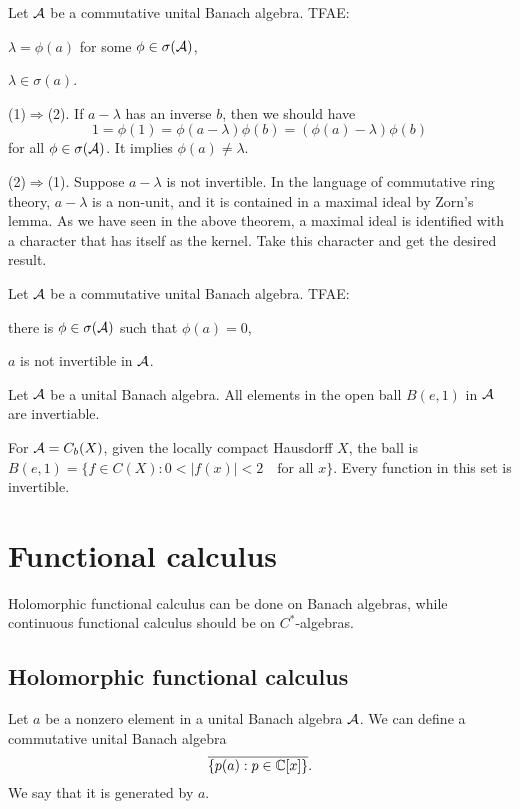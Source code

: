 \documentclass{../crs}
\begin{document}
\begin{thm}
Let $\mathcal{A}$ be a commutative unital Banach algebra.
TFAE:
\begin{cond}
\item $\lambda=\phi(a)$ for some $\phi\in\sigma(\mathcal{A})$,
\item $\lambda\in\sigma(a)$.
\end{cond}
\end{thm}
\begin{pf}
(1)$\Rightarrow$(2).
If $a-\lambda$ has an inverse $b$, then we should have
\[1=\phi(1)=\phi(a-\lambda)\phi(b)=(\phi(a)-\lambda)\phi(b)\]
for all $\phi\in\sigma(\mathcal{A})$.
It implies $\phi(a)\ne\lambda$.

(2)$\Rightarrow$(1).
Suppose $a-\lambda$ is not invertible.
In the language of commutative ring theory, $a-\lambda$ is a non-unit, and it is contained in a maximal ideal by Zorn's lemma.
As we have seen in the above theorem, a maximal ideal is identified with a character that has itself as the kernel.
Take this character and get the desired result.
\end{pf}

\begin{cor}
Let $\mathcal{A}$ be a commutative unital Banach algebra.
TFAE:
\begin{cond}
\item there is $\phi\in\sigma(\mathcal{A})$ such that $\phi(a)=0$,
\item $a$ is not invertible in $\mathcal{A}$.
\end{cond}
\end{cor}
\begin{cor}
Let $\mathcal{A}$ be a unital Banach algebra.
All elements in the open ball $B(e,1)$ in $\mathcal{A}$ are invertiable.
\end{cor}
\begin{ex}
For $\mathcal{A}=C_b(X)$, given the locally compact Hausdorff $X$, the ball is $B(e,1)=\{f\in C(X):0<|f(x)|<2\quad\text{for all }x\}$.
Every function in this set is invertible.
\end{ex}


\section{Functional calculus}

Holomorphic functional calculus can be done on Banach algebras, while continuous functional calculus should be on $C^*$-algebras.

\subsection{Holomorphic functional calculus}
Let $a$ be a nonzero element in a unital Banach algebra $\mathcal{A}$.
We can define a commutative unital Banach algebra
\[\overline{\{p(a):p\in\mathbb{C}[x]\}}.\]
We say that it is generated by $a$.
\end{document}
